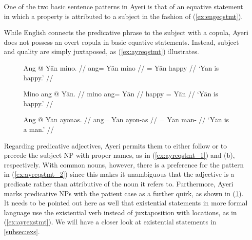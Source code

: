 One of the two basic sentence patterns in Ayeri is that of an equative
statement in which a property is attributed to a subject in the fashion of 
(\ref{ex:engeqstmt}).

\pex\label{ex:engeqstmt}
\a\label{ex:engeqstmt_1} 
\a\label{ex:engeqstmt_2} 
\a\label{ex:engeqstmt_3} 
\xe

While English connects the predicative phrase to the subject with a copula,
Ayeri does not possess an overt copula in basic equative statements. Instead,
subject and quality are simply juxtaposed, as (\ref{ex:ayreqstmt}) illustrates.

\begin{figure}[h]
\pex\label{ex:ayreqstmt}
\a\label{ex:ayreqstmt_1}\begingl
	\gla Ang @ Yān mino. //
	\glb ang= Yān mino //
	\glc \Aarg{}= Yān happy //
	\glft `Yan is happy.' //
\endgl

\a\label{ex:ayreqstmt_2}\begingl
	\gla Mino ang @ Yān. //
	\glb mino ang= Yān //
	\glc happy \Aarg{}= Yān //
	\glft `Yān is happy.' //
\endgl

\a\label{ex:ayreqstmt_3}\begingl
	\gla Ang @ Yān ayonas. //
	\glb ang= Yān ayon-as //
	\glc \Aarg{}= Yān man-\Parg{} //
	\glft `Yān is a man.' //
\endgl
\xe
\end{figure}

Regarding predicative adjectives, Ayeri permits them to either follow or to
precede the subject NP with proper names, as in (\ref{ex:ayreqstmt_1}) and (b),
respectively. With common nouns, however, there is a preference for the pattern
in (\ref{ex:ayreqstmt_2}) since this makes it unambiguous that the adjective is
a predicate rather than attributive of the noun it refers to. Furthermore,
Ayeri marks predicative NPs with the patient case as a further quirk, as shown
in (\ref{ex:ayreqstmt_3}). It needs to be pointed out here as well that
existential statements in more formal language use the existential verb
 instead of juxtaposition with
locations, as in (\ref{ex:ayrexstmt}). We will have a closer look at
existential statements in \autoref{subsec:exs}.

